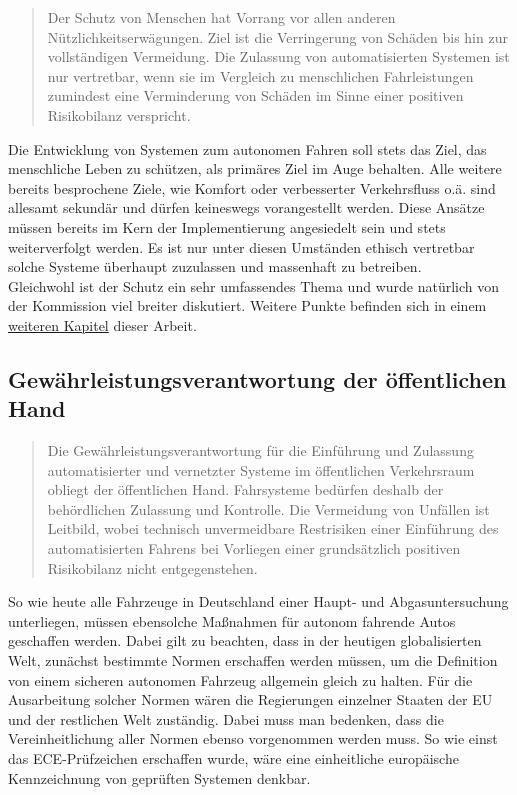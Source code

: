 \documentclass[twoside,a4paper,12pt]{article}
\begin{document}
\begin{quote}
\glqq
Der Schutz von Menschen hat Vorrang vor allen anderen Nützlichkeitserwägungen. Ziel
ist die Verringerung von Schäden bis hin zur vollständigen Vermeidung. Die Zulassung
von automatisierten Systemen ist nur vertretbar, wenn sie im Vergleich zu menschlichen
Fahrleistungen zumindest eine Verminderung von Schäden im Sinne einer positiven Risikobilanz verspricht.\grqq\mbox{~\cite[S. 10]{ek}}
\end{quote}
Die Entwicklung von Systemen zum autonomen Fahren soll stets das Ziel, das menschliche Leben zu schützen, als primäres Ziel im Auge behalten. Alle weitere bereits besprochene Ziele, wie Komfort oder verbesserter Verkehrsfluss o.ä. sind allesamt sekundär und dürfen keineswegs vorangestellt werden. Diese Ansätze müssen bereits im Kern der Implementierung angesiedelt sein und stets weiterverfolgt werden. Es ist nur unter diesen Umständen ethisch vertretbar solche Systeme überhaupt zuzulassen und massenhaft zu betreiben. \\ Gleichwohl ist der Schutz ein sehr umfassendes Thema und wurde natürlich von der Kommission viel breiter diskutiert. Weitere Punkte  befinden sich in einem  \hyperlink{target1}{weiteren Kapitel}  dieser Arbeit.

\subsection{Gewährleistungsverantwortung der öffentlichen Hand} \label{GewaehrleistungsverantwortungDerOeffentlichenHand}

\begin{quote}
\glqq
Die Gewährleistungsverantwortung für die Einführung und Zulassung automatisierter
und vernetzter Systeme im öffentlichen Verkehrsraum obliegt der öffentlichen Hand.
Fahrsysteme bedürfen deshalb der behördlichen Zulassung und Kontrolle. Die Vermeidung von Unfällen ist Leitbild, wobei technisch 
unvermeidbare Restrisiken einer Einführung des automatisierten Fahrens bei Vorliegen einer grundsätzlich positiven Risikobilanz
nicht entgegenstehen.\grqq\mbox{~\cite[S. 10]{ek}}
\end{quote}
So wie heute alle Fahrzeuge in Deutschland einer Haupt- und Abgasuntersuchung unterliegen, müssen ebensolche Maßnahmen für autonom fahrende Autos geschaffen werden. Dabei gilt zu beachten, dass in der heutigen globalisierten Welt, zunächst bestimmte Normen erschaffen werden  müssen, um die Definition von einem sicheren autonomen Fahrzeug allgemein gleich zu halten. Für die Ausarbeitung solcher Normen wären die Regierungen einzelner Staaten der EU und der restlichen Welt zuständig. Dabei muss man bedenken, dass die Vereinheitlichung aller Normen ebenso vorgenommen werden muss. So wie einst das ECE-Prüfzeichen erschaffen wurde, wäre eine einheitliche europäische Kennzeichnung von geprüften Systemen denkbar.
\end{document}
